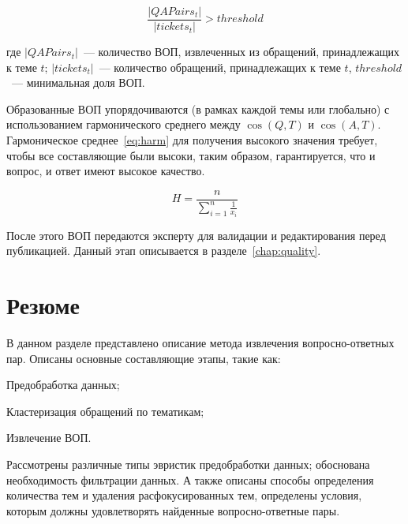 \begin{equation}\label{eq:thr}
\frac{|QAPairs_t|}{|tickets_t|}>threshold
\end{equation}

\noindent
где $|QAPairs_t|$~--- количество ВОП, извлеченных из обращений, принадлежащих к теме $t$; $|tickets_t|$~--- количество обращений, принадлежащих к теме $t$, $threshold$~--- минимальная доля ВОП.

Образованные ВОП упорядочиваются (в рамках каждой темы или глобально) с использованием гармонического среднего между $\cos(Q,T)$ и $\cos(A,T)$. Гармоническое среднее~\eqref{eq:harm} для получения высокого значения требует, чтобы все составляющие были высоки, таким образом, гарантируется, что и вопрос, и ответ имеют высокое качество.

\begin{equation}\label{eq:harm}
H = \frac{n}{\sum_{i=1}^n\frac{1}{x_i}}
\end{equation}

После этого ВОП передаются эксперту для валидации и редактирования перед публикацией.  Данный этап описывается в разделе~\ref{chap:quality}.

\section{Резюме}
\label{sec:dev_concl}

В данном разделе представлено описание метода извлечения вопросно-ответных пар. Описаны основные составляющие этапы, такие как:

\begin{itemize*}
\item Предобработка данных;
\item Кластеризация обращений по тематикам;
\item Извлечение ВОП.
\end{itemize*}

Рассмотрены различные типы эвристик предобработки данных; обоснована необходимость фильтрации данных. А также описаны способы определения количества тем и удаления расфокусированных тем, определены условия, которым должны удовлетворять найденные вопросно-ответные пары.